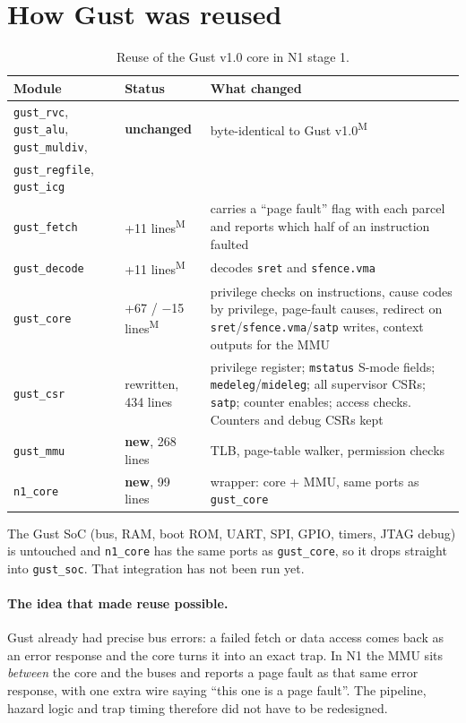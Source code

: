 \documentclass[10pt,a4paper]{article}
\newcommand{\code}[1]{\texttt{#1}}
\newcommand{\meas}{\textsuperscript{M}}
\begin{document}
\section{How Gust was reused}\label{sec:reuse}
\begin{table}[h]\centering\small
\begin{tabular}{@{}llp{78mm}@{}}\toprule
Module & Status & What changed \\\midrule
\code{gust\_rvc}, \code{gust\_alu}, \code{gust\_muldiv}, & \textbf{unchanged} & byte-identical to Gust v1.0\meas \\
\code{gust\_regfile}, \code{gust\_icg} & & \\
\code{gust\_fetch} & +11 lines\meas & carries a ``page fault'' flag with each parcel and reports which half of an instruction faulted \\
\code{gust\_decode} & +11 lines\meas & decodes \code{sret} and \code{sfence.vma} \\
\code{gust\_core} & +67 / $-$15 lines\meas & privilege checks on instructions, cause codes by privilege, page-fault causes, redirect on \code{sret}/\code{sfence.vma}/\code{satp} writes, context outputs for the MMU \\
\code{gust\_csr} & rewritten, 434 lines & privilege register; \code{mstatus} S-mode fields; \code{medeleg}/\code{mideleg}; all supervisor CSRs; \code{satp}; counter enables; access checks. Counters and debug CSRs kept \\
\code{gust\_mmu} & \textbf{new}, 268 lines & TLB, page-table walker, permission checks \\
\code{n1\_core} & \textbf{new}, 99 lines & wrapper: core + MMU, same ports as \code{gust\_core} \\\bottomrule
\end{tabular}
\caption{Reuse of the Gust v1.0 core in N1 stage 1.}\label{tab:reuse}
\end{table}
The Gust SoC (bus, RAM, boot ROM, UART, SPI, GPIO, timers, JTAG debug) is untouched and \code{n1\_core} has the same ports as \code{gust\_core}, so it drops straight into \code{gust\_soc}. That integration has not been run yet.

\paragraph{The idea that made reuse possible.} Gust already had precise bus errors: a failed fetch or data access comes back as an error response and the core turns it into an exact trap. In N1 the MMU sits \emph{between} the core and the buses and reports a page fault as that same error response, with one extra wire saying ``this one is a page fault''. The pipeline, hazard logic and trap timing therefore did not have to be redesigned.
\end{document}
